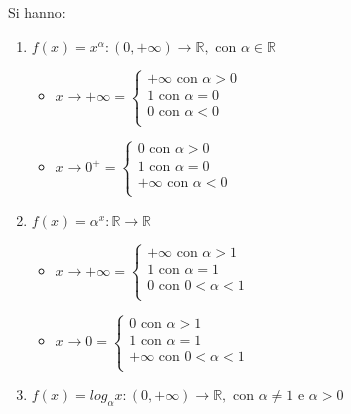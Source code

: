 \documentclass[a4paper,12pt, oneside]{book}
\begin{document}
\newpage
\begin{shaded}
  \begin{nota} Si hanno:
    \begin{enumerate}
      \item $f(x)=x^\alpha : (0,+\infty)\rightarrow \mathbb{R}, \mbox{ con
      }\alpha \in \mathbb{R}$
      \begin{itemize}
        \item $x\rightarrow +\infty=\left\{
          \begin{array}{ll} +\infty \mbox{ con } \alpha>0 \\ 1 \mbox{ con }
            \alpha=0 \\ 0 \mbox{ con } \alpha<0 \\
          \end{array} \right.$
        \item $x\rightarrow 0^{+}=\left\{
          \begin{array}{ll} 0 \mbox{ con } \alpha>0 \\ 1 \mbox{ con } \alpha=0
            \\ +\infty \mbox{ con } \alpha<0 \\
          \end{array} \right.$
      \end{itemize}
      \item $f(x)=\alpha^x : \mathbb{R}\rightarrow \mathbb{R}$
      \begin{itemize}
        \item $x\rightarrow +\infty=\left\{
          \begin{array}{ll} +\infty \mbox{ con } \alpha>1 \\ 1 \mbox{ con }
            \alpha=1 \\ 0 \mbox{ con } 0<\alpha<1 \\
          \end{array} \right.$
        \item $x\rightarrow 0=\left\{
          \begin{array}{ll} 0 \mbox{ con } \alpha>1 \\ 1 \mbox{ con } \alpha=1
            \\ +\infty \mbox{ con } 0<\alpha<1 \\
          \end{array} \right.$
      \end{itemize}
      \item $f(x)=log_\alpha x : (0,+\infty)\rightarrow \mathbb{R}, \mbox{ con }
      \alpha\neq 1 \mbox{ e } \alpha >0$

\end{enumerate}
\end{nota}
\end{shaded}
\end{document}

